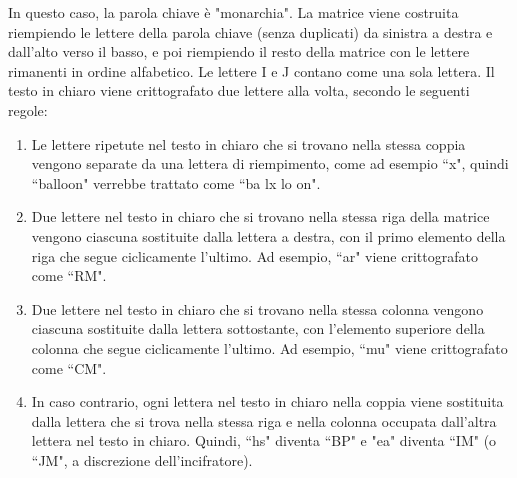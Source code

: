 \begin{center}
    \end{center}
In questo caso, la parola chiave è "monarchia". La matrice viene costruita riempiendo le lettere della parola chiave (senza duplicati) da sinistra a destra e dall'alto verso il basso, e poi riempiendo il resto della matrice con le lettere rimanenti in ordine alfabetico. Le lettere I e J contano come una sola lettera. Il testo in chiaro viene crittografato due lettere alla volta, secondo le seguenti regole:
\begin{enumerate}
    \item Le lettere ripetute nel testo in chiaro che si trovano nella stessa coppia 
    vengono separate da una lettera di riempimento, come ad esempio ``x", quindi ``balloon" 
    verrebbe trattato come ``ba lx lo on".
    \item Due lettere nel testo in chiaro che si trovano nella stessa riga della matrice
    vengono ciascuna sostituite dalla lettera a destra, con il primo elemento della riga
    che segue ciclicamente l'ultimo. Ad esempio, ``ar" viene crittografato come ``RM".
    \item Due lettere nel testo in chiaro che si trovano nella stessa colonna vengono ciascuna
    sostituite dalla lettera sottostante, con l'elemento superiore della colonna che segue
    ciclicamente l'ultimo. Ad esempio, ``mu" viene crittografato come ``CM".
    \item In caso contrario, ogni lettera nel testo in chiaro nella coppia viene sostituita
    dalla lettera che si trova nella stessa riga e nella colonna occupata dall'altra lettera
    nel testo in chiaro. Quindi, ``hs" diventa ``BP" e "ea" diventa ``IM" (o ``JM", a discrezione
    dell'incifratore).
\end{enumerate}
